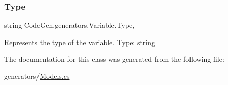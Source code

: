 \subsubsection{\texorpdfstring{Type}{Type}}
{\footnotesize\ttfamily string Code\+Gen.\+generators.\+Variable.\+Type\hspace{0.3cm}{\ttfamily [get]}, {\ttfamily [set]}}



Represents the type of the variable. Type\+: string 



The documentation for this class was generated from the following file\+:\begin{DoxyCompactItemize}
\item 
generators/\mbox{\hyperlink{Models_8cs}{Models.\+cs}}\end{DoxyCompactItemize}
